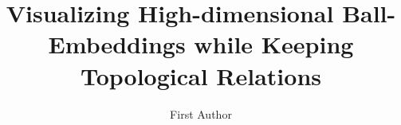 \documentclass[]{article}
\title{Visualizing High-dimensional Ball-Embeddings
	while Keeping Topological Relations}
\author{First Author}
\begin{document}
\maketitle

\begin{abstract}

\end{abstract}

\section{}
\end{document}
